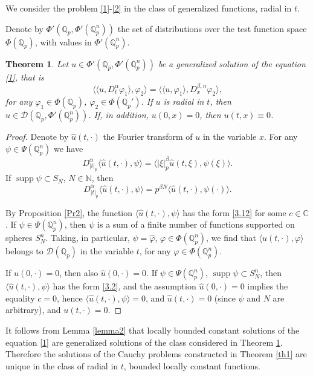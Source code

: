 \documentclass[14pt]{article}
\DeclareMathOperator{\supp}{supp}
\theoremstyle{theorem}
\newtheorem{theorem}{Theorem}[section]
\theoremstyle{theorem}
\theoremstyle{definition}
\theoremstyle{lemma}
\newcommand{\Label}[1]{\label{#1}}
\numberwithin{equation}{section}
\begin{document}
We consider the problem \eqref{1}-\eqref{2} in the class of generalized functions, radial in $t$.

Denote by $\Phi'(\mathbb{Q}_p,\Phi'(\mathbb{Q}_p^n))$ the set of distributions over the test function space $\Phi(\mathbb{Q}_p)$, with values in $\Phi'(\mathbb{Q}_p^n)$.

\begin{theorem}\Label{th2}
Let $u\in\Phi'(\mathbb{Q}_p,\Phi'(\mathbb{Q}_p^n))$ be a generalized solution of the equation \eqref{1}, that is
$$\langle\langle u,D_t^{\alpha}\varphi_1\rangle,\varphi_2\rangle=\langle\langle u,\varphi_1\rangle,D_x^{\beta,n}\varphi_2\rangle,$$
for any $\varphi_1\in\Phi(\mathbb{Q}_p)$, $\varphi_2\in\Phi(\mathbb{Q}_p')$. If $u$ is radial in $t$, then $u\in\mathcal{D}(\mathbb{Q}_p,\Phi'(\mathbb{Q}_p^n))$. If, in addition, $u(0,x)=0$, then $u(t,x)\equiv0$.
\end{theorem}

\begin{proof}
Denote by $\widehat{u}(t,\cdot)$ the Fourier transform of $u$ in the variable $x$. For any $\psi\in\Psi(\mathbb{Q}_p^n)$ we have
$$D_{|t|_p}^{\alpha}\langle\widehat{u}(t,\cdot),\psi\rangle=\langle|\xi|_p^{\beta}\widehat{u}(t,\xi),\psi(\xi)\rangle.$$
If $\supp\psi\subset S_N$, $N\in\mathbb{N}$, then
$$D_{|t|_p}^{\alpha}\langle\widehat{u}(t,\cdot),\psi\rangle=p^{\beta N}\langle\widehat{u}(t,\cdot),\psi(\cdot)\rangle.$$

By Proposition \ref{Pr2}, the function $\langle \widehat{u}(t,\cdot),\psi\rangle$ has the form \eqref{3.12} for some $c\in\mathbb{C}$. If $\psi\in\Psi(\mathbb{Q}_p^n)$, then $\psi$ is a sum of a finite number of functions supported on spheres $S_N^n$. Taking, in particular, $\psi=\widehat{\varphi}$, $\varphi\in\Phi(\mathbb{Q}_p^n)$, we find that $\langle u(t,\cdot),\varphi\rangle$ belongs to $\mathcal{D}(\mathbb{Q}_p)$ in the variable $t$, for any $\varphi\in\Phi(\mathbb{Q}_p^n)$.

If $u(0,\cdot)=0$, then also $\widehat{u}(0,\cdot)=0$. If $\psi\in\Psi(\mathbb{Q}_p^n)$, $\supp\psi\subset S_N^n$, then $\langle\widehat{u}(t,\cdot),\psi\rangle$ has the form \eqref{3.2}, and the assumption $\widehat{u}(0,\cdot)=0$ implies the equality $c=0$, hence $\langle\widehat{u}(t,\cdot),\psi\rangle=0$, and $\widehat{u}(t,\cdot)=0$ (since $\psi$ and $N$ are arbitrary), and $u(t,\cdot)=0$.
\end{proof}

It follows from Lemma \ref{lemma2} that locally bounded constant solutions of the equation \eqref{1} are generalized solutions of the class considered in Theorem \ref{th2}. Therefore the solutions of the Cauchy problems constructed in Theorem \ref{th1} are unique in the class of radial in $t$, bounded locally constant functions.
\end{document}
